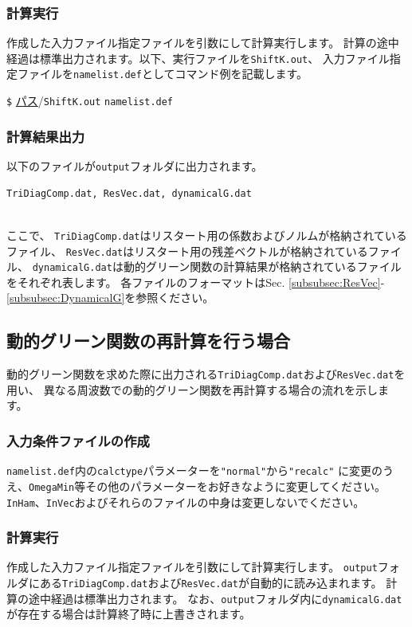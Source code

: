 \documentclass[12pt,titlepage]{jarticle}
\begin{document}
\subsubsection*{計算実行}
作成した入力ファイル指定ファイルを引数にして計算実行します。
計算の途中経過は標準出力されます。以下、実行ファイルを\verb|ShiftK.out|、
入力ファイル指定ファイルを\verb|namelist.def|としてコマンド例を記載します。

\verb|$| \underline{パス}/\verb|ShiftK.out| \verb|namelist.def|

\subsubsection*{計算結果出力}
以下のファイルが\verb|output|フォルダに出力されます。
\\
\begin{minipage}{11cm}
\begin{screen}
\begin{verbatim}
TriDiagComp.dat, ResVec.dat, dynamicalG.dat
\end{verbatim}
\end{screen}
\end{minipage}
\\
ここで、
\verb|TriDiagComp.dat|はリスタート用の係数およびノルムが格納されているファイル、
\verb|ResVec.dat|はリスタート用の残差ベクトルが格納されているファイル、
\verb|dynamicalG.dat|は動的グリーン関数の計算結果が格納されているファイルをそれぞれ表します。
各ファイルのフォーマットはSec. \ref{subsubsec:ResVec}-\ref{subsubsec:DynamicalG}を参照ください。

\subsection{動的グリーン関数の再計算を行う場合}
動的グリーン関数を求めた際に出力される\verb|TriDiagComp.dat|および\verb|ResVec.dat|を用い、
異なる周波数での動的グリーン関数を再計算する場合の流れを示します。
\subsubsection*{入力条件ファイルの作成}
\verb|namelist.def|内の\verb|calctype|パラメーターを\verb|"normal"|から\verb|"recalc"|
に変更のうえ、\verb|OmegaMin|等その他のパラメーターをお好きなように変更してください。
\verb|InHam|、\verb|InVec|およびそれらのファイルの中身は変更しないでください。

\subsubsection*{計算実行}
作成した入力ファイル指定ファイルを引数にして計算実行します。
\verb|output|フォルダにある\verb|TriDiagComp.dat|および\verb|ResVec.dat|が自動的に読み込まれます。
計算の途中経過は標準出力されます。
なお、\verb|output|フォルダ内に\verb|dynamicalG.dat|が存在する場合は計算終了時に上書きされます。
\end{document}
